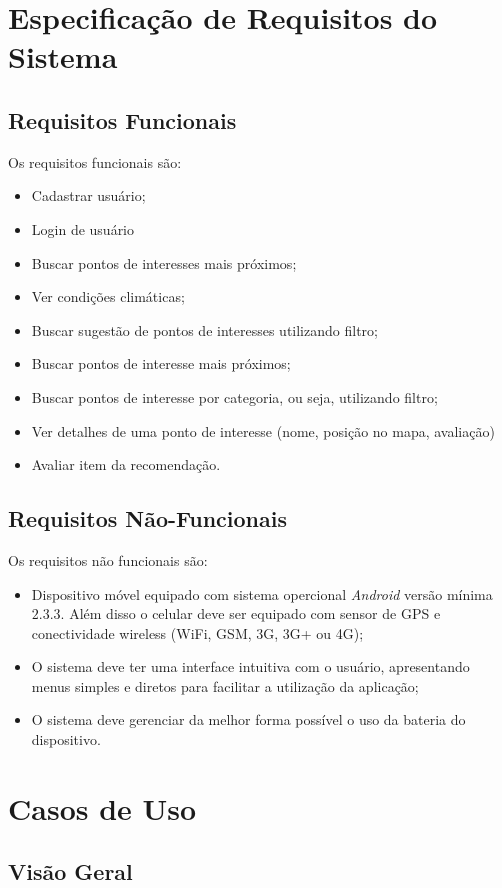 \documentclass[11pt,a4paper,oneside]{article}
\begin{document}
\section{Especificação de Requisitos do Sistema}

\subsection{Requisitos Funcionais}
Os requisitos funcionais são:
\begin{itemize}
\item Cadastrar usuário;
\item Login de usuário
\item Buscar pontos de interesses mais próximos;
\item Ver condições climáticas;
\item Buscar sugestão de pontos de interesses utilizando filtro;
\item Buscar pontos de interesse mais próximos;
\item Buscar pontos de interesse por categoria, ou seja, utilizando filtro;
\item Ver detalhes de uma ponto de interesse (nome, posição no mapa, avaliação)
\item Avaliar item da recomendação.
\end{itemize}

\subsection{Requisitos Não-Funcionais}
Os requisitos não funcionais são:
\begin{itemize}
\item Dispositivo móvel equipado com sistema opercional \emph{Android} versão mínima $2.3.3$. Além disso o celular deve ser equipado com sensor de GPS e conectividade wireless (WiFi, GSM, 3G, 3G+ ou 4G);
\item O sistema deve ter uma interface intuitiva com o usuário, apresentando menus simples e diretos para facilitar a utilização da aplicação;
\item O sistema deve gerenciar da melhor forma possível o uso da bateria do dispositivo.
\end{itemize}

\section{Casos de Uso}
\subsection{Visão Geral}
\end{document}
